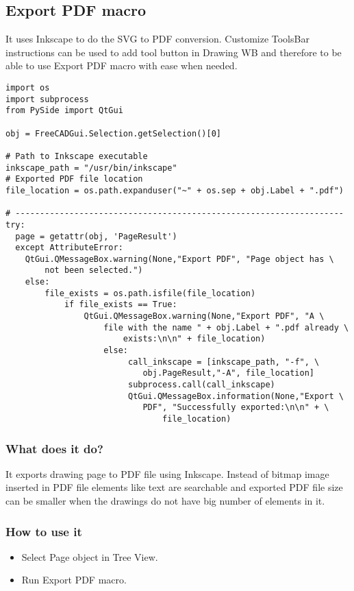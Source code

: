 \subsection{Export PDF macro}
It uses Inkscape to do the SVG to PDF conversion. Customize ToolsBar 
instructions can be used to add tool button in Drawing WB and therefore 
to be able to use Export PDF macro with ease when needed.
\begin{lstlisting}  
import os
import subprocess
from PySide import QtGui

obj = FreeCADGui.Selection.getSelection()[0]

# Path to Inkscape executable
inkscape_path = "/usr/bin/inkscape"
# Exported PDF file location
file_location = os.path.expanduser("~" + os.sep + obj.Label + ".pdf")

# -------------------------------------------------------------------
try:
  page = getattr(obj, 'PageResult')
  except AttributeError:
    QtGui.QMessageBox.warning(None,"Export PDF", "Page object has \
        not been selected.")
    else:
        file_exists = os.path.isfile(file_location)
            if file_exists == True:
                QtGui.QMessageBox.warning(None,"Export PDF", "A \
                    file with the name " + obj.Label + ".pdf already \
                        exists:\n\n" + file_location)
                    else:
                         call_inkscape = [inkscape_path, "-f", \
                            obj.PageResult,"-A", file_location]
                         subprocess.call(call_inkscape)
                         QtGui.QMessageBox.information(None,"Export \
                            PDF", "Successfully exported:\n\n" + \
                                file_location)
\end{lstlisting}  

\subsubsection{What does it do?}
It exports drawing page to PDF file using Inkscape. Instead of bitmap 
image inserted in PDF file elements like text are searchable and exported 
PDF file size can be smaller when the drawings do not have big number of 
elements in it.
\subsubsection{How to use it}
\begin{itemize}
\item Select Page object in Tree View.
\item Run Export PDF macro.
\end{itemize}
